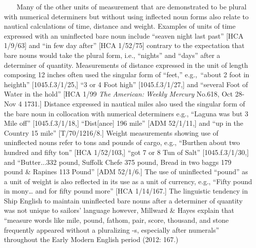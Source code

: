 ~~~  Many of the other units of measurement that are demonstrated to be plural with numerical determiners but without using inflected noun forms also relate to nautical calculations of time, distance and weight. Examples of units of time expressed with an uninflected bare noun include “seaven night last past” [HCA 1/9/63] and “in few day after” [HCA 1/52/75] contrary to the expectation that bare nouns would take the plural form, i.e., “nights” and “days” after a determiner of quantity. Measurements of distance expressed in the unit of length composing 12 inches often used the singular form of “feet,” e.g.,~“about 2 foot in heighth” [1045.f.3/1/25,] “3 or 4 Foot high” [1045.f.3/1/27,] and “several Foot of Water in the hold” [HCA 1/99 \textit{The} \textit{American:} \textit{Weekly} \textit{Mercury} No.618, Oct 28-Nov 4 1731.] Distance expressed in nautical miles also used the singular form of the bare noun in collocation with numerical determiners e.g., “Laguna was but 3 Mile off” [1045.f.3/1/18,] “Dist[ance] 196 mile” [ADM 52/1/11,] and “up in the Country 15 mile” [T/70/1216/8.] Weight measurements showing use of uninflected nouns refer to tons and pounds of cargo, e.g., “Burthen about two hundred and fifty ton” [HCA 1/52/103,] “got 7 or 8 Tun of Salt” [1045.f.3/1/30,] and “Butter...332 pound, Suffolk Chefe 375 pound, Bread in two baggs 179 pound \& Rapines 113 Pound” [ADM 52/1/6.] The use of uninflected “pound” as a unit of weight is also reflected in its use as a unit of currency, e.g., “Fifty pound in mony… and for fifty pound more” [HCA 1/14/167.] The linguistic tendency in Ship English to maintain uninflected bare nouns after a determiner of quantity was not unique to sailors’ language however, Millward \& Hayes explain that “measure words like mile, pound, fathom, pair, score, thousand, and stone frequently appeared without a pluralizing -s, especially after numerals” throughout the Early Modern English period (2012: 167.)

